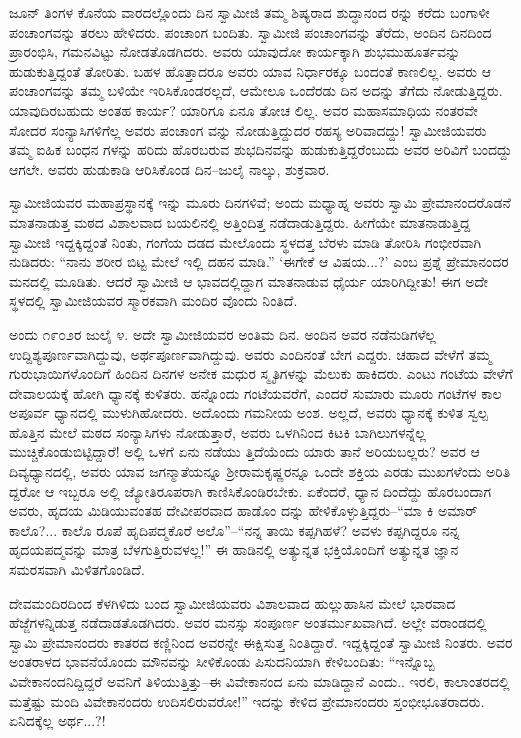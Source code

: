 ಜೂನ್ ತಿಂಗಳ ಕೊನೆಯ ವಾರದಲ್ಲೊಂದು ದಿನ ಸ್ವಾಮೀಜಿ ತಮ್ಮ ಶಿಷ್ಯರಾದ ಶುದ್ಧಾನಂದ ರನ್ನು ಕರೆದು ಬಂಗಾಳೀ ಪಂಚಾಂಗವನ್ನು ತರಲು ಹೇಳಿದರು. ಪಂಚಾಂಗ ಬಂದಿತು. ಸ್ವಾಮೀಜಿ ಪಂಚಾಂಗವನ್ನು ತೆರೆದು, ಅಂದಿನ ದಿನದಿಂದ ಪ್ರಾರಂಭಿಸಿ, ಗಮನವಿಟ್ಟು ನೋಡತೊಡಗಿದರು. ಅವರು ಯಾವುದೋ ಕಾರ್ಯಕ್ಕಾಗಿ ಶುಭಮುಹೂರ್ತವನ್ನು ಹುಡುಕುತ್ತಿದ್ದಂತೆ ತೋರಿತು. ಬಹಳ ಹೊತ್ತಾದರೂ ಅವರು ಯಾವ ನಿರ್ಧಾರಕ್ಕೂ ಬಂದಂತೆ ಕಾಣಲಿಲ್ಲ. ಅವರು ಆ ಪಂಚಾಂಗವನ್ನು ತಮ್ಮ ಬಳಿಯೇ ಇರಿಸಿಕೊಂಡರಲ್ಲದೆ, ಆಮೇಲೂ ಒಂದೆರಡು ದಿನ ಅದನ್ನು ತೆಗೆದು ನೋಡುತ್ತಿದ್ದರು. ಯಾವುದಿರಬಹುದು ಅಂತಹ ಕಾರ್ಯ? ಯಾರಿಗೂ ಏನೂ ತೋಚ ಲಿಲ್ಲ. ಅವರ ಮಹಾಸಮಾಧಿಯ ನಂತರವೇ ಸೋದರ ಸಂನ್ಯಾಸಿಗಳಿಗೆಲ್ಲ ಅವರು ಪಂಚಾಂಗ ವನ್ನು ನೋಡುತ್ತಿದ್ದುದರ ರಹಸ್ಯ ಅರಿವಾದದ್ದು! ಸ್ವಾಮೀಜಿಯವರು ತಮ್ಮ ಐಹಿಕ ಬಂಧನ ಗಳನ್ನು ಹರಿದು ಹೊರಬರುವ ಶುಭದಿನವನ್ನು ಹುಡುಕುತ್ತಿದ್ದರೆಂಬುದು ಅವರ ಅರಿವಿಗೆ ಬಂದದ್ದು ಆಗಲೇ. ಅವರು ಹುಡುಕಾಡಿ ಆರಿಸಿಕೊಂಡ ದಿನ–ಜುಲೈ ನಾಲ್ಕು, ಶುಕ್ರವಾರ.

ಸ್ವಾಮೀಜಿಯವರ ಮಹಾಪ್ರಸ್ಥಾನಕ್ಕೆ ಇನ್ನು ಮೂರು ದಿನಗಳಿವೆ; ಅಂದು ಮಧ್ಯಾಹ್ನ ಅವರು ಸ್ವಾಮಿ ಪ್ರೇಮಾನಂದರೊಡನೆ ಮಾತನಾಡುತ್ತ ಮಠದ ವಿಶಾಲವಾದ ಬಯಲಿನಲ್ಲಿ ಅತ್ತಿಂದಿತ್ತ ನಡೆದಾಡುತ್ತಿದ್ದರು. ಹೀಗೆಯೇ ಮಾತನಾಡುತ್ತಿದ್ದ ಸ್ವಾಮೀಜಿ ಇದ್ದಕ್ಕಿದ್ದಂತೆ ನಿಂತು, ಗಂಗೆಯ ದಡದ ಮೇಲೊಂದು ಸ್ಥಳದತ್ತ ಬೆರಳು ಮಾಡಿ ತೋರಿಸಿ ಗಂಭೀರವಾಗಿ ನುಡಿದರು: “ನಾನು ಶರೀರ ಬಿಟ್ಟ ಮೇಲೆ ಇಲ್ಲಿ ದಹನ ಮಾಡಿ.” ‘ಈಗೇಕೆ ಆ ವಿಷಯ...?’ ಎಂಬ ಪ್ರಶ್ನೆ ಪ್ರೇಮಾನಂದರ ಮನದಲ್ಲಿ ಮೂಡಿತು. ಆದರೆ ಸ್ವಾಮೀಜಿ ಆ ಭಾವದಲ್ಲಿದ್ದಾಗ ಮಾತನಾಡುವ ಧೈರ್ಯ ಯಾರಿಗಿದ್ದೀತು! ಈಗ ಅದೇ ಸ್ಥಳದಲ್ಲಿ ಸ್ವಾಮೀಜಿಯವರ ಸ್ಮಾರಕವಾಗಿ ಮಂದಿರ ವೊಂದು ನಿಂತಿದೆ.

ಅಂದು ೧೯೦೨ರ ಜುಲೈ ೪. ಅದೇ ಸ್ವಾಮೀಜಿಯವರ ಅಂತಿಮ ದಿನ. ಅಂದಿನ ಅವರ ನಡೆನುಡಿಗಳೆಲ್ಲ ಉದ್ದಿಶ್ಯಪೂರ್ಣವಾಗಿದ್ದುವು, ಅರ್ಥಪೂರ್ಣವಾಗಿದ್ದುವು. ಅವರು ಎಂದಿನಂತೆ ಬೇಗ ಎದ್ದರು. ಚಹಾದ ವೇಳೆಗೆ ತಮ್ಮ ಗುರುಭಾಯಿಗಳೊಂದಿಗೆ ಹಿಂದಿನ ದಿನಗಳ ಅನೇಕ ಮಧುರ ಸ್ಮೃತಿಗಳನ್ನು ಮೆಲುಕು ಹಾಕಿದರು. ಎಂಟು ಗಂಟೆಯ ವೇಳೆಗೆ ದೇವಾಲಯಕ್ಕೆ ಹೋಗಿ ಧ್ಯಾನಕ್ಕೆ ಕುಳಿತರು. ಹನ್ನೊಂದು ಗಂಟೆಯವರೆಗೆ, ಎಂದರೆ ಸುಮಾರು ಮೂರು ಗಂಟೆಗಳ ಕಾಲ ಅಪೂರ್ವ ಧ್ಯಾನದಲ್ಲಿ ಮುಳುಗಿಹೋದರು. ಅದೊಂದು ಗಮನೀಯ ಅಂಶ. ಅಲ್ಲದೆ, ಅವರು ಧ್ಯಾನಕ್ಕೆ ಕುಳಿತ ಸ್ವಲ್ಪ ಹೊತ್ತಿನ ಮೇಲೆ ಮಠದ ಸಂನ್ಯಾಸಿಗಳು ನೋಡುತ್ತಾರೆ, ಅವರು ಒಳಗಿನಿಂದ ಕಿಟಕಿ ಬಾಗಿಲುಗಳನ್ನೆಲ್ಲ ಮುಚ್ಚಿಕೊಂಡುಬಿಟ್ಟಿದ್ದಾರೆ! ಅಲ್ಲಿ ಒಳಗೆ ಏನು ನಡೆಯು ತ್ತಿದೆಯೆಂದು ಯಾರು ತಾನೆ ಅರಿಯಬಲ್ಲರು? ಅವರ ಆ ದಿವ್ಯಧ್ಯಾನದಲ್ಲಿ, ಅವರು ಯಾವ ಜಗನ್ಮಾತೆಯನ್ನೂ ಶ್ರೀರಾಮಕೃಷ್ಣರನ್ನೂ ಒಂದೇ ಶಕ್ತಿಯ ಎರಡು ಮುಖಗಳೆಂದು ಅರಿತಿ ದ್ದರೋ ಆ ಇಬ್ಬರೂ ಅಲ್ಲಿ ಜ್ಯೋತಿರೂಪರಾಗಿ ಕಾಣಿಸಿಕೊಂಡಿರಬೇಕು. ಏಕೆಂದರೆ, ಧ್ಯಾನ ದಿಂದೆದ್ದು ಹೊರಬಂದಾಗ ಅವರು, ಹೃದಯ ಮಿಡಿಯುವಂತಹ ದೇವೀಪರವಾದ ಹಾಡೊಂ ದನ್ನು ಹೇಳಿಕೊಳ್ಳುತ್ತಿದ್ದರು–“ಮಾ ಕಿ ಅಮಾರ್​ಕಾಲೊ?... ಕಾಲೊ ರೂಪೆ ಹೃದಿಪದ್ಮಕೊರೆ ಅಲೊ”–“ನನ್ನ ತಾಯಿ ಕಪ್ಪಗಿಹಳೆ? ಅವಳು ಕಪ್ಪಗಿದ್ದರೂ ನನ್ನ ಹೃದಯಪದ್ಮವನ್ನು ಮಾತ್ರ ಬೆಳಗುತ್ತಿರುವಳಲ್ಲ!” ಈ ಹಾಡಿನಲ್ಲಿ ಅತ್ಯುನ್ನತ ಭಕ್ತಿಯೊಂದಿಗೆ ಅತ್ಯುನ್ನತ ಜ್ಞಾನ ಸಮರಸವಾಗಿ ಮಿಳಿತಗೊಂಡಿದೆ.

ದೇವಮಂದಿರದಿಂದ ಕೆಳಗಿಳಿದು ಬಂದ ಸ್ವಾಮೀಜಿಯವರು ವಿಶಾಲವಾದ ಹುಲ್ಲುಹಾಸಿನ ಮೇಲೆ ಭಾರವಾದ ಹೆಜ್ಜೆಗಳನ್ನಿಡುತ್ತ ನಡೆದಾಡತೊಡಗಿದರು. ಅವರ ಮನಸ್ಸು ಸಂಪೂರ್ಣ ಅಂತರ್ಮುಖವಾಗಿದೆ. ಅಲ್ಲೇ ವರಾಂಡದಲ್ಲಿ ಸ್ವಾಮಿ ಪ್ರೇಮಾನಂದರು ಕಾತರದ ಕಣ್ಣಿನಿಂದ ಅವರನ್ನೇ ಈಕ್ಷಿಸುತ್ತ ನಿಂತಿದ್ದಾರೆ. ಇದ್ದಕ್ಕಿದ್ದಂತೆ ಸ್ವಾಮೀಜಿ ನಿಂತರು. ಅವರ ಅಂತರಾಳದ ಭಾವನೆಯೊಂದು ಮೌನವನ್ನು ಸೀಳಿಕೊಂಡು ಪಿಸುದನಿಯಾಗಿ ಕೇಳಿಬಂದಿತು: “ಇನ್ನೊಬ್ಬ ವಿವೇಕಾನಂದನಿದ್ದಿದ್ದರೆ ಅವನಿಗೆ ತಿಳಿಯುತ್ತಿತ್ತು–ಈ ವಿವೇಕಾನಂದ ಏನು ಮಾಡಿದ್ದಾನೆ ಎಂದು.. ಇರಲಿ, ಕಾಲಾಂತರದಲ್ಲಿ ಮತ್ತೆಷ್ಟು ಮಂದಿ ವಿವೇಕಾನಂದರು ಉದಿಸಲಿರುವರೋ!” ಇದನ್ನು ಕೇಳಿದ ಪ್ರೇಮಾನಂದರು ಸ್ತಂಭೀಭೂತರಾದರು. ಏನಿದಕ್ಕೆಲ್ಲ ಅರ್ಥ...?!

